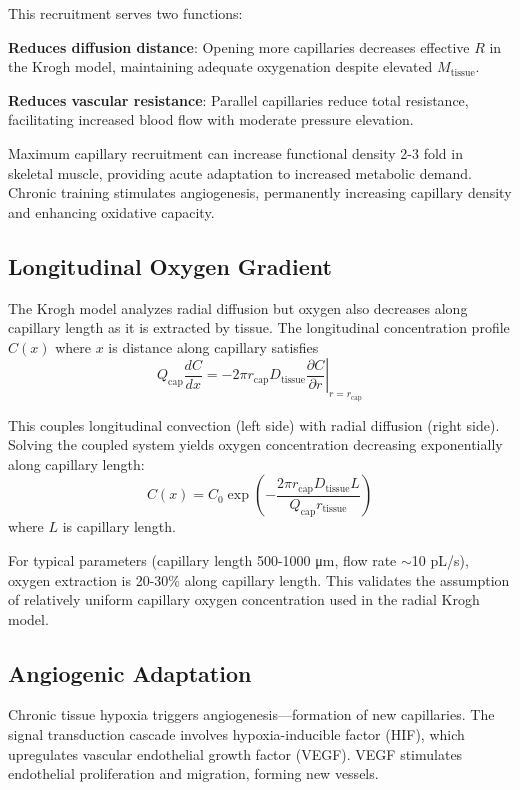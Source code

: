 \documentclass[10pt,twocolumn,a4paper]{article}
\theoremstyle{remark}
\begin{document}
This recruitment serves two functions:

\textbf{Reduces diffusion distance}: Opening more capillaries decreases effective $R$ in the Krogh model, maintaining adequate oxygenation despite elevated $M_{\mathrm{tissue}}$.

\textbf{Reduces vascular resistance}: Parallel capillaries reduce total resistance, facilitating increased blood flow with moderate pressure elevation.

Maximum capillary recruitment can increase functional density 2-3 fold in skeletal muscle, providing acute adaptation to increased metabolic demand. Chronic training stimulates angiogenesis, permanently increasing capillary density and enhancing oxidative capacity.

\subsection{Longitudinal Oxygen Gradient}

The Krogh model analyzes radial diffusion but oxygen also decreases along capillary length as it is extracted by tissue. The longitudinal concentration profile $C(x)$ where $x$ is distance along capillary satisfies
\begin{equation}
Q_{\mathrm{cap}} \frac{dC}{dx} = -2\pi r_{\mathrm{cap}} D_{\mathrm{tissue}} \left.\frac{\partial C}{\partial r}\right|_{r=r_{\mathrm{cap}}}
\end{equation}

This couples longitudinal convection (left side) with radial diffusion (right side). Solving the coupled system yields oxygen concentration decreasing exponentially along capillary length:
\begin{equation}
C(x) = C_{0} \exp\left(-\frac{2\pi r_{\mathrm{cap}} D_{\mathrm{tissue}} L}{Q_{\mathrm{cap}} r_{\mathrm{tissue}}}\right)
\end{equation}
where $L$ is capillary length.

For typical parameters (capillary length 500-1000 μm, flow rate $\sim$10 pL/s), oxygen extraction is 20-30\% along capillary length. This validates the assumption of relatively uniform capillary oxygen concentration used in the radial Krogh model.

\subsection{Angiogenic Adaptation}

Chronic tissue hypoxia triggers angiogenesis—formation of new capillaries. The signal transduction cascade involves hypoxia-inducible factor (HIF), which upregulates vascular endothelial growth factor (VEGF). VEGF stimulates endothelial proliferation and migration, forming new vessels.
\end{document}
